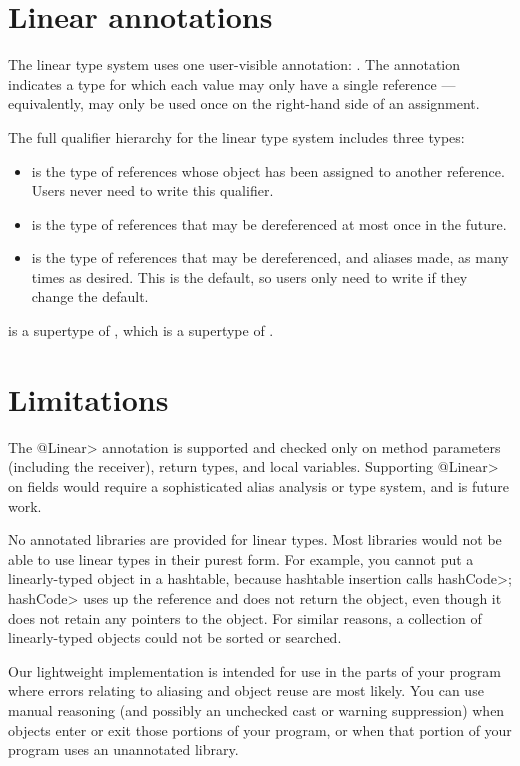 \section{Linear annotations\label{linear-annotations}}

The linear type system uses one user-visible annotation:
.  The annotation indicates
a type for which each value may only have a single reference ---
equivalently, may only be used once on the right-hand side of an
assignment.

The full qualifier hierarchy for the linear type system includes three
types:
\begin{itemize}
\item
{} is the type of references whose object has been assigned to
another reference.  Users never need to write this qualifier.
\item
{} is the type of references that may be dereferenced at
most once in the future.
\item
{} is the type of references that may be dereferenced, and
aliases made, as many times as desired.  This is the default, so users only
need to write  if they change the default.
\end{itemize}


\noindent
{} is a supertype of , which is a
supertype of .



\section{Limitations\label{linear-limitations}}

The \<@Linear> annotation is supported and checked only on method
parameters (including the receiver), return types, and local variables.
Supporting \<@Linear> on fields would require a sophisticated alias
analysis or type system, and is future work.

No annotated libraries are provided for linear types.  Most libraries would
not be able to use linear types in their purest form.  For example, you
cannot put a linearly-typed object in a hashtable, because hashtable
insertion calls \<hashCode>; \<hashCode> uses up the reference and does not
return the object, even though it does not retain any pointers to the
object.  For similar reasons, a collection of linearly-typed objects could
not be sorted or searched.

Our lightweight implementation is intended for use in the parts of your
program where errors relating to aliasing and object reuse are most likely.
You can use manual reasoning (and possibly an unchecked cast or warning
suppression) when objects enter or exit those portions of your program, or
when that portion of your program uses an unannotated library.


